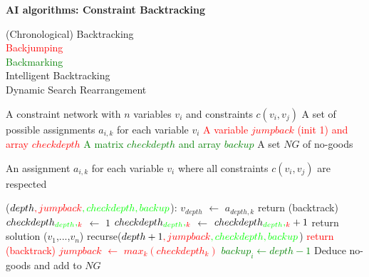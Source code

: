 \documentclass[11pt] {article}
\newcommand{\algorithmicinput}{\textbf{Input:}}
\newcommand{\algorithmicoutput}{\textbf{Output:}}
\newcommand{\INPUT}{\item[\algorithmicinput]}
\newcommand{\OUTPUT}{\item[\algorithmicoutput]}
\newcommand{\algorithmicalgo}{\textbf{Algorithm}}
\newcommand{\ALGO}{\item[\algorithmicalgo]}
\begin{document}
\pagestyle{empty}


\begin{center}
\LARGE
\textbf{AI algorithms: Constraint Backtracking}\\
\end{center}

\noindent \large{(Chronological) Backtracking}\\
\textcolor{red}{\large{Backjumping}}\\
\textcolor{green}{\large{Backmarking}}\\
\textcolor[rgb]{1,0.5,0}{Intelligent Backtracking}\\
\textcolor[rgb]{1,0,1}{Dynamic Search Rearrangement}\\

\begin{algorithmic}
\INPUT
\STATE A constraint network with $n$ variables $v_i$ and constraints $c(v_i,v_j)$
\STATE A set of possible assignments $a_{i,k}$ for each variable $v_i$
\STATE \textcolor{red}{A variable $jumpback$ (init 1) and array $checkdepth$}
\STATE \textcolor{green}{A matrix $checkdepth$ and array $backup$}
\STATE \textcolor[rgb]{1,0.5,0}{A set $NG$ of no-goods}

\OUTPUT
\STATE An assignment $a_{i,k}$ for each variable $v_i$ where all constraints $c(v_i,v_j)$ are respected

\ALGO($depth\textcolor{red}{,jumpback}\textcolor{green}{,checkdepth,backup}$):
\STATE $v_{depth}$ $\leftarrow$ $a_{depth,k}$
\textcolor[rgb]{1,0.5,0}{
\STATE return (backtrack)
\ENDIF
}
\STATE $checkdepth\textcolor{green}{_{depth},}\textcolor{red}{_{k}}$ $\leftarrow$ $1$
\STATE $checkdepth\textcolor{green}{_{depth},}\textcolor{red}{_{k}}$ $\leftarrow$ $checkdepth\textcolor{green}{_{depth},}\textcolor{red}{_{k}}+1$
\ENDIF
\ENDFOR
{}
\STATE return solution ($v_1$,...,$v_n$)
\ENDIF
\STATE recurse($depth+1\textcolor{red}{,jumpback}\textcolor{green}{,checkdepth,backup}$)
\textcolor{red}{
\STATE return (backtrack)
\ENDIF
}
\ENDIF
\ENDIF
\ENDFOR
\STATE \textcolor{red}{$jumpback$ $\leftarrow$ $max_{k}(checkdepth_{k})$}
\textcolor{green}{
\STATE $backup_{i} \leftarrow depth-1$
\ENDFOR
}
\textcolor[rgb]{1,0.5,0}{
\STATE Deduce no-goods and add to $NG$
\ENDIF
}
\end{algorithmic}
\end{document}
